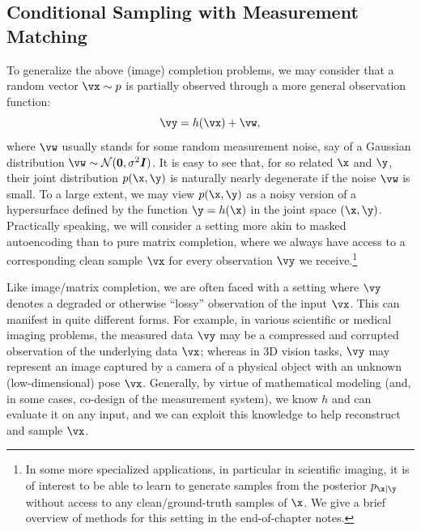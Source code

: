 \documentclass[../../book-main.tex]{subfiles}
\begin{document}
\subsection{Conditional Sampling with Measurement
Matching}\label{sub:measurement-matching}
To generalize the above (image) completion problems, we may consider
that a random vector $\vx \sim p$ is partially observed through a more
general observation function:
\begin{equation}\label{eq:measurement-matching-observation}
\vy = h(\vx) + \vw,
\end{equation}
where $\vw$ usually stands for some random measurement noise, say of
a Gaussian distribution $\vw \sim \mathcal{N}(\mathbf{0}, \sigma^2
\boldsymbol{I})$. It is easy to see that, for so related $\x$ and $\y$, their joint distribution $p(\x, \y)$ is naturally nearly degenerate if the noise $\vw$ is small. To a large extent, we may view $p(\x, \y)$ as a noisy version of a hypersurface defined by the function $\y = h(\x)$ in the joint space $(\x, \y)$.  Practically speaking, we will consider a setting more akin to masked autoencoding than to pure matrix completion, where we always have access to a corresponding clean sample $\vx$ for every observation $\vy$ we receive.\footnote{In some more specialized applications, in particular in scientific imaging, it is of interest to be able to learn to generate samples
from the posterior $p_{\x \mid \y}$ without access to any clean/ground-truth samples of $\x$. We give a brief overview of methods for this setting in the
end-of-chapter notes.}

Like image/matrix completion, we
are often faced with a setting where $\vy$ denotes a degraded or otherwise
``lossy''
observation of the input $\vx$. This can manifest in quite different
forms. For example, in various scientific or
medical imaging problems, the measured data $\vy$ may be a compressed and
corrupted observation of the underlying data $\vx$; whereas in 3D vision tasks,
$\vy$ may represent an image captured by a camera of a physical object with an
unknown (low-dimensional) pose $\vx$.
Generally, by virtue of mathematical modeling (and, in some cases, co-design
of the measurement system), we know $h$ and can evaluate it on any input, and
we can exploit this knowledge to help reconstruct and sample $\vx$.
\end{document}
